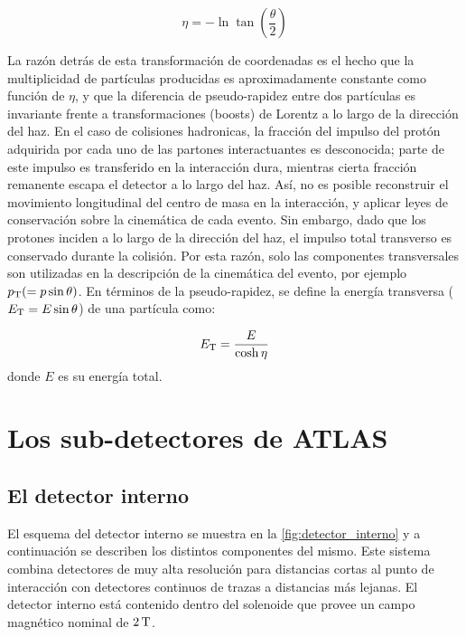 \begin{equation}
  \eta = - \ln \tan \left( \frac{\theta}{2} \right)
\end{equation}

La razón detrás de esta transformación de coordenadas es el hecho que la
multiplicidad de partículas producidas es aproximadamente constante como función
de $\eta$, y que la diferencia de pseudo-rapidez entre dos partículas es
invariante frente a transformaciones (boosts) de Lorentz a lo largo de la
dirección del haz. En el caso de colisiones hadronicas, la fracción del impulso
del protón adquirida por cada uno de las partones interactuantes es desconocida;
parte de este impulso es transferido en la interacción dura, mientras cierta
fracción remanente escapa el detector a lo largo del haz. Así, no es posible
reconstruir el movimiento longitudinal del centro de masa en la interacción, y
aplicar leyes de conservación sobre la cinemática de cada evento. Sin embargo,
dado que los protones inciden a lo largo de la dirección del haz, el impulso
total transverso es conservado durante la colisión. Por esta razón, solo las
componentes transversales son utilizadas en la descripción de la cinemática del
evento, por ejemplo $p_{\mathrm{T}} (= p \sin \theta)$. En términos de
la pseudo-rapidez, se define la energía transversa ($E_{\mathrm{T}} = E \sin \theta$) de una partícula como:


\begin{equation}
  \et = \frac{E}{\cosh \eta}
\end{equation}
%
donde $E$ es su energía total.


\section{Los sub-detectores de ATLAS}


\subsection{El detector interno}

El esquema del detector interno se muestra en la
\cref{fig:detector_interno} y a continuación se describen los distintos componentes
del mismo. Este sistema combina detectores de muy alta
resolución para distancias cortas al punto de interacción con detectores
continuos de trazas a distancias más lejanas. El detector interno está contenido
dentro del solenoide que provee un campo magnético nominal de $\unit[2]{T}$.

